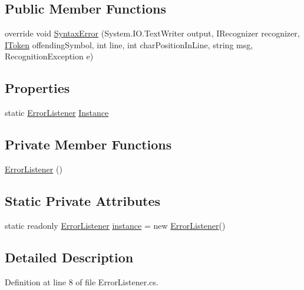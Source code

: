 \subsection*{Public Member Functions}
\begin{DoxyCompactItemize}
\item 
override void \hyperlink{a00090_a47fb9f6d50aa6a4e4796dea10b237fe4}{Syntax\-Error} (System.\-I\-O.\-Text\-Writer output, I\-Recognizer recognizer, \hyperlink{a00301_ae3d87b0b748ea892bff48f60862e182d}{I\-Token} offending\-Symbol, int line, int char\-Position\-In\-Line, string msg, Recognition\-Exception e)
\end{DoxyCompactItemize}
\subsection*{Properties}
\begin{DoxyCompactItemize}
\item 
static \hyperlink{a00090}{Error\-Listener} \hyperlink{a00090_a47b8f4f1d414afa1ea6067218c7ee34d}{Instance}
\end{DoxyCompactItemize}
\subsection*{Private Member Functions}
\begin{DoxyCompactItemize}
\item 
\hyperlink{a00090_a1f0cc41aac10bd8a2402355534c1123c}{Error\-Listener} ()
\end{DoxyCompactItemize}
\subsection*{Static Private Attributes}
\begin{DoxyCompactItemize}
\item 
static readonly \hyperlink{a00090}{Error\-Listener} \hyperlink{a00090_a9421873edea84c51d5905f5a24c62479}{instance} = new \hyperlink{a00090}{Error\-Listener}()
\end{DoxyCompactItemize}


\subsection{Detailed Description}


Definition at line 8 of file Error\-Listener.\-cs.



